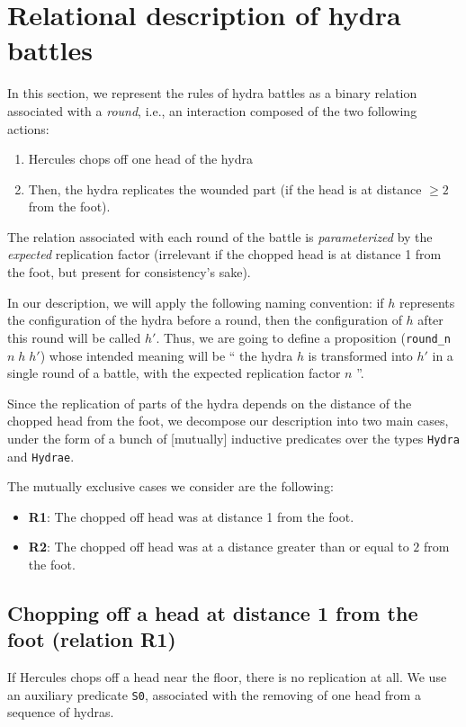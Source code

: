 \documentclass[a4paper]{book}
\begin{document}
\section{Relational description of hydra battles}


In this section, we represent the rules of hydra battles as a binary relation associated with
a \emph{round}, i.e., an interaction composed of the two following actions:
\begin{enumerate}
\item Hercules chops off one head of the hydra
\item Then, the  hydra replicates the wounded part (if the head is at distance $\geq 2$ from the foot).
\end{enumerate}
The relation associated with each round of the battle is \emph{parameterized}  by the \emph{expected} replication  factor (irrelevant if the chopped head is at distance 1 from the foot,
but present for consistency's sake).

In our description,  we will apply the following naming convention: if $h$ represents the configuration of the hydra before a round, then the configuration of $h$ after this round will be called $h'$.
 Thus, we are going to define a proposition  (\texttt{round\_n $n\;h\;h'$})  whose intended meaning will be `` the hydra $h$  is transformed into $h'$  in a single round of a battle, with the expected replication factor $n$ ''.


Since the replication of parts of the hydra depends on the distance of the chopped head from  the foot, we  decompose our description into two main  cases, under the form of a bunch of [mutually] inductive predicates over the types \texttt{Hydra} and \texttt{Hydrae}.

The mutually exclusive cases we consider are the following:
\begin{itemize}
\item \textbf{R1}: The chopped off head was at distance 1 from the foot.
\item \textbf{R2}: The chopped off head was at a distance greater than or equal to  $2$ from the foot.
\end{itemize}



\subsection{Chopping off a head at distance 1 from the foot (relation  R1)}

If Hercules chops off a head near the floor, there is no replication at all. We use an auxiliary 
predicate \texttt{S0}, associated with the removing of one head from a sequence of hydras.
\end{document}
